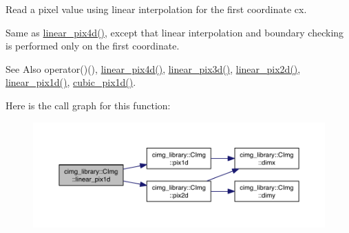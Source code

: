 Read a pixel value using linear interpolation for the first coordinate {\ttfamily cx}. 


\begin{DoxyItemize}
\item Same as \hyperlink{structcimg__library_1_1_c_img_ad201bbecc0caabbe566ea7507cd657cf}{linear\-\_\-pix4d()}, except that linear interpolation and boundary checking is performed only on the first coordinate.
\end{DoxyItemize}

\begin{DoxySeeAlso}{See Also}
operator()(), \hyperlink{structcimg__library_1_1_c_img_ad201bbecc0caabbe566ea7507cd657cf}{linear\-\_\-pix4d()}, \hyperlink{structcimg__library_1_1_c_img_a99af7b06c856fffc82a8872f2ebd5e8c}{linear\-\_\-pix3d()}, \hyperlink{structcimg__library_1_1_c_img_a94e74f9969caf1db1f862ec9c145ed29}{linear\-\_\-pix2d()}, \hyperlink{structcimg__library_1_1_c_img_a510052a861eff8b05a02ba2f4427ed62}{linear\-\_\-pix1d()}, \hyperlink{structcimg__library_1_1_c_img_ad344a30f3cdc6d089ef2267a86d4847f}{cubic\-\_\-pix1d()}. 
\end{DoxySeeAlso}


Here is the call graph for this function\-:
\nopagebreak
\begin{figure}[H]
\begin{center}
\leavevmode
\includegraphics[width=350pt]{structcimg__library_1_1_c_img_a510052a861eff8b05a02ba2f4427ed62_cgraph}
\end{center}
\end{figure}


